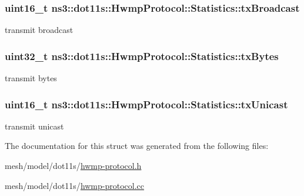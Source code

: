 \subsubsection[{\texorpdfstring{tx\+Broadcast}{txBroadcast}}]{\setlength{\rightskip}{0pt plus 5cm}uint16\+\_\+t ns3\+::dot11s\+::\+Hwmp\+Protocol\+::\+Statistics\+::tx\+Broadcast}\hypertarget{structns3_1_1dot11s_1_1HwmpProtocol_1_1Statistics_a49bb09b5b0893eebcc853b112afff30f}{}\label{structns3_1_1dot11s_1_1HwmpProtocol_1_1Statistics_a49bb09b5b0893eebcc853b112afff30f}


transmit broadcast 

\subsubsection[{\texorpdfstring{tx\+Bytes}{txBytes}}]{\setlength{\rightskip}{0pt plus 5cm}uint32\+\_\+t ns3\+::dot11s\+::\+Hwmp\+Protocol\+::\+Statistics\+::tx\+Bytes}\hypertarget{structns3_1_1dot11s_1_1HwmpProtocol_1_1Statistics_a507c7a9383e255dd2402d42c8218b416}{}\label{structns3_1_1dot11s_1_1HwmpProtocol_1_1Statistics_a507c7a9383e255dd2402d42c8218b416}


transmit bytes 

\subsubsection[{\texorpdfstring{tx\+Unicast}{txUnicast}}]{\setlength{\rightskip}{0pt plus 5cm}uint16\+\_\+t ns3\+::dot11s\+::\+Hwmp\+Protocol\+::\+Statistics\+::tx\+Unicast}\hypertarget{structns3_1_1dot11s_1_1HwmpProtocol_1_1Statistics_a7d9d31219b5c2b3a713ba09ddd43044a}{}\label{structns3_1_1dot11s_1_1HwmpProtocol_1_1Statistics_a7d9d31219b5c2b3a713ba09ddd43044a}


transmit unicast 



The documentation for this struct was generated from the following files\+:\begin{DoxyCompactItemize}
\item 
mesh/model/dot11s/\hyperlink{hwmp-protocol_8h}{hwmp-\/protocol.\+h}\item 
mesh/model/dot11s/\hyperlink{hwmp-protocol_8cc}{hwmp-\/protocol.\+cc}\end{DoxyCompactItemize}
